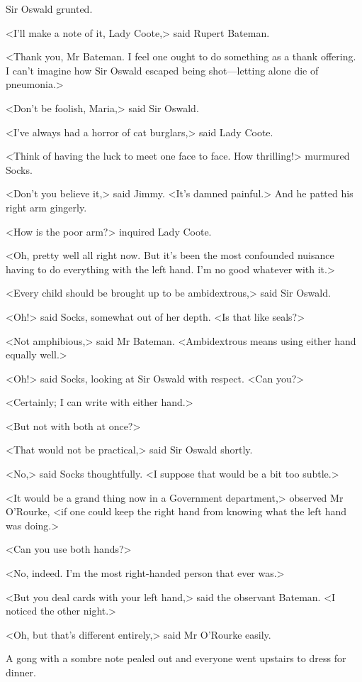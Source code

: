 Sir Oswald grunted.

<I'll make a note of it, Lady Coote,> said Rupert Bateman.

<Thank you, Mr Bateman. I feel one ought to do something as a thank offering. I can't imagine how Sir Oswald escaped being shot—letting alone die of pneumonia.>

<Don't be foolish, Maria,> said Sir Oswald.

<I've always had a horror of cat burglars,> said Lady Coote.

<Think of having the luck to meet one face to face. How thrilling!> murmured Socks.

<Don't you believe it,> said Jimmy. <It's damned painful.> And he patted his right arm gingerly.

<How is the poor arm?> inquired Lady Coote.

<Oh, pretty well all right now. But it's been the most confounded nuisance having to do everything with the left hand. I'm no good whatever with it.>

<Every child should be brought up to be ambidextrous,> said Sir Oswald.

<Oh!> said Socks, somewhat out of her depth. <Is that like seals?>

<Not amphibious,> said Mr Bateman. <Ambidextrous means using either hand equally well.>

<Oh!> said Socks, looking at Sir Oswald with respect. <Can you?>

<Certainly; I can write with either hand.>

<But not with both at once?>

<That would not be practical,> said Sir Oswald shortly.

<No,> said Socks thoughtfully. <I suppose that would be a bit too subtle.>

<It would be a grand thing now in a Government department,> observed Mr O'Rourke, <if one could keep the right hand from knowing what the left hand was doing.>

<Can you use both hands?>

<No, indeed. I'm the most right-handed person that ever was.>

<But you deal cards with your left hand,> said the observant Bateman. <I noticed the other night.>

<Oh, but that's different entirely,> said Mr O'Rourke easily.

A gong with a sombre note pealed out and everyone went upstairs to dress for dinner.

